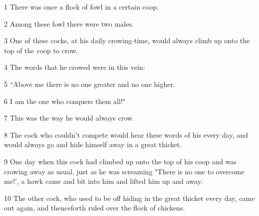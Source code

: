 
{1 There was once a flock of fowl in a certain coop. }

{2 Among these fowl there were two males.}

{3 One of these cocks, at his daily crowing-time, would always climb up
onto the top of the coop to crow. }

{4 The words that he crowed were in this vein: }

{5 ``Above me there is no one greater and no one higher. }

{6 I am the one who conquers them all!" }

{7 This was the way he would always crow.}

{8 The cock who couldn't compete would hear these words of his every day,
and would always go and hide himself away in a great thicket. }

{9 One day when this cock had climbed up onto the top of his coop and was
crowing away as usual, just as he was screaming "There is no one to overcome
me!', a hawk came and bit into him and lifted him up and away. }

{10 The other cock, who used to be off hiding in the great thicket every
day, came out again, and thenceforth ruled over the flock of chickens. }


